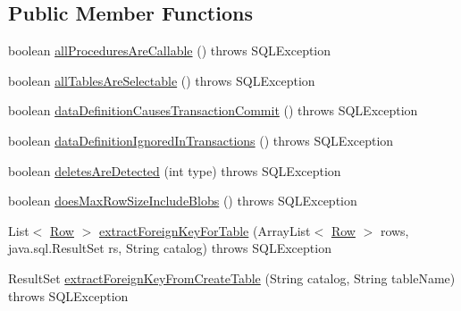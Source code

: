 \subsection*{Public Member Functions}
\begin{DoxyCompactItemize}
\item 
boolean \mbox{\hyperlink{classcom_1_1mysql_1_1cj_1_1jdbc_1_1_database_meta_data_a2b6b0b60b80c5bea15da284eeed3e8ec}{all\+Procedures\+Are\+Callable}} ()  throws S\+Q\+L\+Exception 
\item 
boolean \mbox{\hyperlink{classcom_1_1mysql_1_1cj_1_1jdbc_1_1_database_meta_data_a7e50917c8e8311e43527930167d79b50}{all\+Tables\+Are\+Selectable}} ()  throws S\+Q\+L\+Exception 
\item 
boolean \mbox{\hyperlink{classcom_1_1mysql_1_1cj_1_1jdbc_1_1_database_meta_data_a1c6698693e477a2dc7a76ef58fbc350a}{data\+Definition\+Causes\+Transaction\+Commit}} ()  throws S\+Q\+L\+Exception 
\item 
boolean \mbox{\hyperlink{classcom_1_1mysql_1_1cj_1_1jdbc_1_1_database_meta_data_a845084ae2565f8acc9b972b9a28f101d}{data\+Definition\+Ignored\+In\+Transactions}} ()  throws S\+Q\+L\+Exception 
\item 
boolean \mbox{\hyperlink{classcom_1_1mysql_1_1cj_1_1jdbc_1_1_database_meta_data_ada4d6165180e979eeb0645fadd72aaf9}{deletes\+Are\+Detected}} (int type)  throws S\+Q\+L\+Exception 
\item 
boolean \mbox{\hyperlink{classcom_1_1mysql_1_1cj_1_1jdbc_1_1_database_meta_data_ad8b1533935ccb3f77b745ccce44dd5b9}{does\+Max\+Row\+Size\+Include\+Blobs}} ()  throws S\+Q\+L\+Exception 
\item 
List$<$ \mbox{\hyperlink{interfacecom_1_1mysql_1_1cj_1_1result_1_1_row}{Row}} $>$ \mbox{\hyperlink{classcom_1_1mysql_1_1cj_1_1jdbc_1_1_database_meta_data_ae35d518bf4a260021412630e03b1c03f}{extract\+Foreign\+Key\+For\+Table}} (Array\+List$<$ \mbox{\hyperlink{interfacecom_1_1mysql_1_1cj_1_1result_1_1_row}{Row}} $>$ rows, java.\+sql.\+Result\+Set rs, String catalog)  throws S\+Q\+L\+Exception 
\item 
Result\+Set \mbox{\hyperlink{classcom_1_1mysql_1_1cj_1_1jdbc_1_1_database_meta_data_ab8cfbacd9dedbfa8fddc87a6925dc96b}{extract\+Foreign\+Key\+From\+Create\+Table}} (String catalog, String table\+Name)  throws S\+Q\+L\+Exception 
\item 
\mbox{\label{classcom_1_1mysql_1_1cj_1_1jdbc_1_1_database_meta_data_a7b3b3d4717e6de73542b0df42becf8b6}} 

\end{DoxyCompactItemize}
